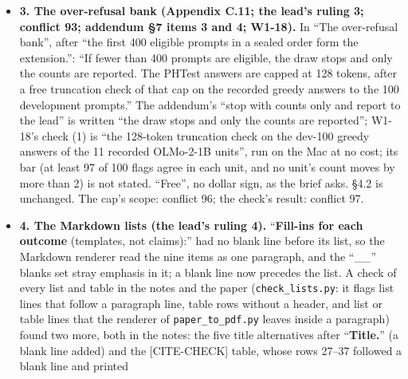 \documentclass{article}
\theoremstyle{plain}
\theoremstyle{definition}
\theoremstyle{remark}
\begin{document}
\begin{itemize}
{        56).} In ``The positive control and the secondary analysis'', after
        ``not that natural erosion has one.'': ``The plant and A1's anchors
        share one source, PKU-SafeRLHF; the disjoint-anchor rank is the planned
        check (Appendix C.5).'' No marker (Appendix C.5's marker covers the
        plan). Sources: addendum \S{}8 item 1 (the plant's rows and Gate C's 128
        anchors come from PKU-SafeRLHF; A1 is bi-anchored on those anchors; the
        disjoint-source rank is a pre-registered sensitivity). It fits with four
        small trims (below). Decision 56 resolved.
  \item \textbf{3. The over-refusal bank (Appendix C.11; the lead's ruling 3;
        conflict 93; addendum \S{}7 items 3 and 4; W1-18).} In ``The
        over-refusal bank'', after ``the first 400 eligible prompts in a sealed
        order form the extension.'': ``If fewer than 400 prompts are eligible,
        the draw stops and only the counts are reported. The PHTest answers are
        capped at 128 tokens, after a free truncation check of that cap on the
        recorded greedy answers to the 100 development prompts.'' The addendum's
        ``stop with counts only and report to the lead'' is written ``the draw
        stops and only the counts are reported''; W1-18's check (1) is ``the
        128-token truncation check on the dev-100 greedy answers of the 11
        recorded OLMo-2-1B units'', run on the Mac at no cost; its bar (at least
        97 of 100 flags agree in each unit, and no unit's count moves by more
        than 2) is not stated. ``Free'', no dollar sign, as the brief asks.
        \S{}4.2 is unchanged. The cap's scope: conflict 96; the check's result:
        conflict 97.
  \item \textbf{4. The Markdown lists (the lead's ruling 4).} ``\textbf{Fill-ins
        for each outcome} (templates, not claims):'' had no blank line before
        its list, so the Markdown renderer read the nine items as one paragraph,
        and the ``\_\_'' blanks set stray emphasis in it; a blank line now
        precedes the list. A check of every list and table in the notes and the
        paper (\nolinkurl{check_lists.py}: it flags list lines that follow a
        paragraph line, table rows without a header, and list or table lines
        that the renderer of \nolinkurl{paper_to_pdf.py} leaves inside a
        paragraph) found two more, both in the notes: the five title
        alternatives after ``\textbf{Title.}'' (a blank line added) and the
        [CITE-CHECK] table, whose rows 27--37 followed a blank line and printed

\end{itemize}
\end{document}
